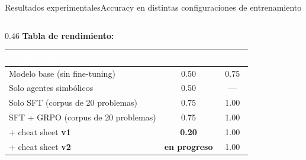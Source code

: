 \documentclass[aspectratio=169,10pt]{beamer}
\newcommand{\cy}[1]{\textcolor{AccentBlue}{\textbf{#1}}}
\begin{document}
\begin{frame}{Resultados experimentales}{Accuracy en distintas configuraciones de entrenamiento}
  \begin{columns}[T,onlytextwidth]
    \begin{column}{0.46\textwidth}
      \vspace{4mm}
      \cy{Tabla de rendimiento:}
      \vspace{3mm}

      {\fontsize{6.5pt}{8pt}\selectfont
        \setlength\arrayrulewidth{0.3pt}
        \begin{tabular*}{\linewidth}{@{\extracolsep{\fill}}lcc}
          \toprule
          \rowcolor{BannerDark}
          \textcolor{white}{\textbf{Configuración}} &
          \textcolor{white}{\textbf{Acc.}} &
          \textcolor{white}{\textbf{Parse}} \\
          \midrule
          \rowcolor{BoxBg}
          Modelo base (sin fine-tuning)  & 0.50 & 0.75 \\
          Solo agentes simbólicos        & 0.50 & ---  \\
          \rowcolor{BoxBg}
          Solo SFT (corpus de 20 problemas)   & 0.75 & 1.00 \\
          SFT + GRPO (corpus de 20 problemas) & 0.75 & 1.00 \\
          \rowcolor{AccentRed!15}
          + cheat sheet \textbf{v1}
          & \textcolor{AccentRed}{\textbf{0.20}} & 1.00 \\
          \rowcolor{AccentGreen!15}
          + cheat sheet \textbf{v2}
          & \textcolor{AccentGreen}{\textbf{en progreso}} & 1.00 \\
          \bottomrule
        \end{tabular*}
      }


\end{column}
\end{columns}
\end{frame}
\end{document}
